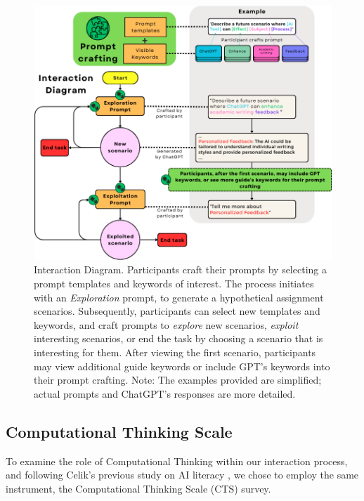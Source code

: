 \documentclass[sn-mathphys, Numbered]{sn-jnl}%
\theoremstyle{thmstyleone}%
\theoremstyle{thmstyletwo}%
\theoremstyle{thmstylethree}%
\begin{document}
\begin{figure}
    \centering
    \includegraphics[width=1\linewidth]{Interaction diagram (5).png}
    \caption{Interaction Diagram. Participants craft their prompts by selecting a prompt templates and keywords of interest. The process initiates with an \textit{Exploration} prompt, to generate a hypothetical assignment scenarios. Subsequently, participants can select new templates and keywords, and craft prompts to \textit{explore} new scenarios, \textit{exploit} interesting scenarios, or end the task by choosing a scenario that is interesting for them. After viewing the first scenario, participants may view additional guide keywords or include GPT's keywords into their prompt crafting. Note: The examples provided are simplified; actual prompts and ChatGPT's responses are more detailed.}
    \label{fig:Interaction Diagram}
\end{figure}

\subsection*{Computational Thinking Scale}

To examine the role of Computational Thinking within our interaction process, and following Celik's previous study on AI literacy \parencite*{celik_exploring_2023}, we chose to employ the same instrument, the Computational Thinking Scale (CTS) survey.
\end{document}
